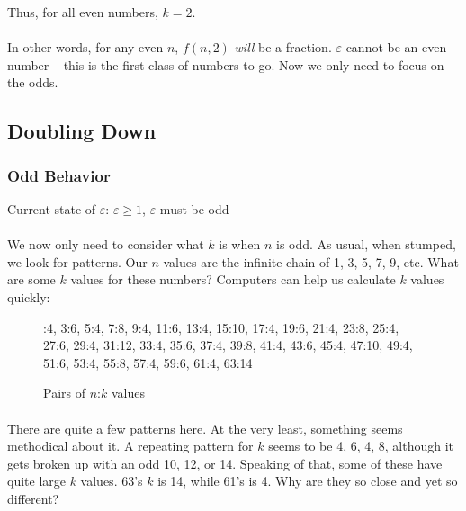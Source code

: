 \documentclass[12pt,letterpaper]{article}
\begin{document}
			\begin{figure*}[h]
				\centering
				Thus, for all even numbers, $k = 2$.
			\end{figure*}
		
			\paragraph{} In other words, for any even $n$, $f(n, 2)$ \textit{will} be a fraction. $\varepsilon$ cannot be an even number -- this is the first class of numbers to go. Now we only need to focus on the odds.
			
	\subsection{Doubling Down}
		
		\subsubsection{Odd Behavior}
		
			\begin{figure*}[h]
				\centering
				Current state of $\varepsilon$: $\varepsilon \geqslant 1$, $\varepsilon$ must be odd
			\end{figure*}
				
			\paragraph{} We now only need to consider what $k$ is when $n$ is odd. As usual, when stumped, we look for patterns. Our $n$ values are the infinite chain of 1, 3, 5, 7, 9, etc. What are some $k$ values for these numbers? Computers can help us calculate $k$ values quickly:
			
			\begin{figure}[h]
				:4, 3:6, 5:4, 7:8, 9:4, 11:6, 13:4, 15:10, 17:4, 19:6, 21:4, 23:8, 25:4, 27:6, 29:4, 31:12, 33:4, 35:6, 37:4, 39:8, 41:4, 43:6, 45:4, 47:10, 49:4, 51:6, 53:4, 55:8, 57:4, 59:6, 61:4, 63:14
				
				\caption{Pairs of $n$:$k$ values}
				\label{fig:nk}
			\end{figure}
		
			\paragraph{} There are quite a few patterns here. At the very least, something seems methodical about it. A repeating pattern for $k$ seems to be 4, 6, 4, 8, although it gets broken up with an odd 10, 12, or 14. Speaking of that, some of these have quite large $k$ values. 63's $k$ is 14, while 61's is 4. Why are they so close and yet so different?
			
\end{document}
